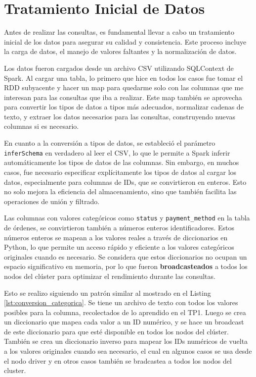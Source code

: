 \section{Tratamiento Inicial de Datos}
\label{sec:tratamiento_inicial_de_datos}

Antes de realizar las consultas, es fundamental llevar a cabo un tratamiento inicial de los datos para asegurar su calidad y consistencia. Este proceso incluye la carga de datos, el manejo de valores faltantes y la normalización de datos.

Los datos fueron cargados desde un archivo CSV utilizando SQLContext de Spark. Al cargar una tabla, lo primero que hice en todos los casos fue tomar el RDD subyacente y hacer un map para quedarme solo con las columnas que me interesan para las consultas que iba a realizar. Este map también se aprovecha para convertir los tipos de datos a tipos más adecuados, normalizar cadenas de texto, y extraer los datos necesarios para las consultas, construyendo nuevas columnas si es necesario.

En cuanto a la conversión a tipos de datos, se estableció el parámetro \texttt{inferSchema} en verdadero al leer el CSV, lo que le permite a Spark inferir automáticamente los tipos de datos de las columnas. Sin embargo, en muchos casos, fue necesario especificar explícitamente los tipos de datos al cargar los datos, especialmente para columnas de IDs, que se convirtieron en enteros. Esto no solo mejora la eficiencia del almacenamiento, sino que también facilita las operaciones de unión y filtrado. 

Las columnas con valores categóricos como \texttt{status} y \texttt{payment\_method} en la tabla de órdenes, se convirtieron también a números enteros identificadores. Estos números enteros se mapean a los valores reales a través de diccionarios en Python, lo que permite un acceso rápido y eficiente a los valores categóricos originales cuando es necesario. Se considera que estos diccionarios no ocupan un espacio significativo en memoria, por lo que fueron \textbf{broadcasteados} a todos los nodos del clúster para optimizar el rendimiento durante las consultas. 

Esto se realizo siguiendo un patrón similar al mostrado en el Listing \ref{lst:conversion_categorica}. Se tiene un archivo de texto con todos los valores posibles para la columna, recolectados de lo aprendido en el TP1. Luego se crea un diccionario que mapea cada valor a un ID numérico, y se hace un broadcast de este diccionario para que esté disponible en todos los nodos del clúster. También se crea un diccionario inverso para mapear los IDs numéricos de vuelta a los valores originales cuando sea necesario, el cual en algunos casos se usa desde el nodo driver y en otros casos también se bradcastea a todos los nodos del cluster.

